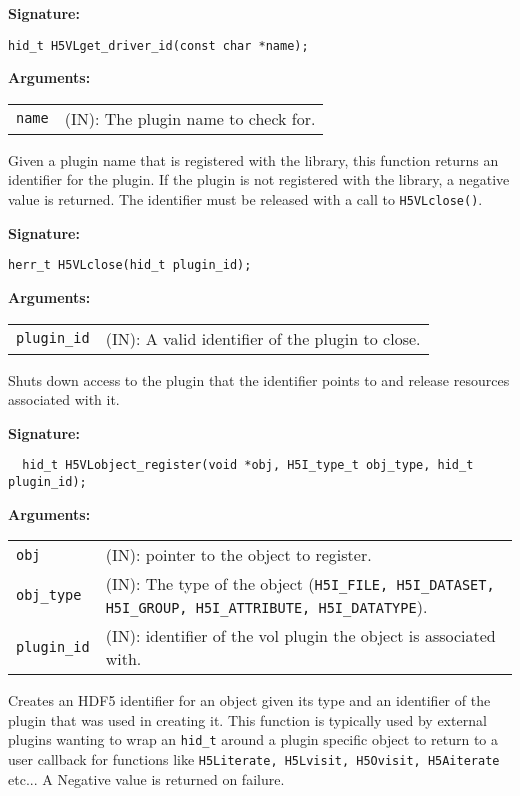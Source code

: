 \begin{mdframed}[style=bgbox]
\textbf{Signature:}
\begin{lstlisting}
hid_t H5VLget_driver_id(const char *name);
\end{lstlisting}
\textbf{Arguments:}\\
\begin{tabular}{l p{13.5cm}}
  {\tt name} & (IN): The plugin name to check for.\\
\end{tabular}
\end{mdframed}
Given a plugin name that is registered with the library, this function returns an identifier for the plugin. If the plugin is not registered with the library, a negative value is returned. The identifier must be released with a call to {\tt H5VLclose()}.\bigskip


\begin{mdframed}[style=bgbox]
\textbf{Signature:}
\begin{lstlisting}
herr_t H5VLclose(hid_t plugin_id);
\end{lstlisting}

\textbf{Arguments:}\\
\begin{tabular}{l p{13.5cm}}
 {\tt plugin\_id} & (IN): A valid identifier of the plugin to close.\\
\end{tabular}
\end{mdframed}
Shuts down access to the plugin that the identifier points to and release resources associated with it.\bigskip


\begin{mdframed}[style=bgbox]
\textbf{Signature:}
\begin{lstlisting}
  hid_t H5VLobject_register(void *obj, H5I_type_t obj_type, hid_t plugin_id);
\end{lstlisting}

\textbf{Arguments:}\\
\begin{tabular}{l p{13.5cm}}
 {\tt obj} & (IN): pointer to the object to register.\\
 {\tt obj\_type} & (IN): The type of the object ({\tt H5I\_FILE, H5I\_DATASET, H5I\_GROUP, H5I\_ATTRIBUTE, H5I\_DATATYPE}).\\
 {\tt plugin\_id} & (IN): identifier of the vol plugin the object is associated with.\\
\end{tabular}
\end{mdframed}
Creates an HDF5 identifier for an object given its type and an identifier of the plugin that was used in creating it. This function is typically used by external plugins wanting to wrap an {\tt hid\_t} around a plugin specific object to return to a user callback for functions like {\tt H5Literate, H5Lvisit, H5Ovisit, H5Aiterate} etc... A Negative value is returned on failure.\bigskip

